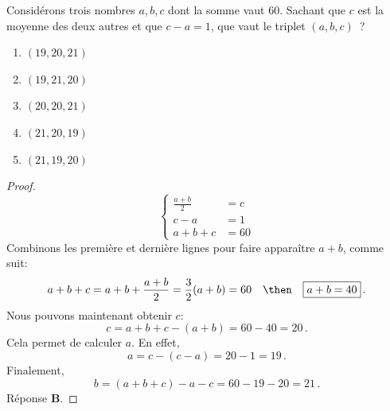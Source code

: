 \label{1.8}%
Considérons trois nombres $a, b, c$ dont la somme vaut $60$. Sachant que $c$
est la moyenne des deux autres et que $c - a = 1$, que vaut le triplet
$(a, b, c)$~?
\begin{enumerate}
  \item $(19,20,21)$
  \item $(19,21,20)$
  \item $(20,20,21)$
  \item $(21,20,19)$
  \item $(21,19,20)$
\end{enumerate}
%
%
\begin{proof}
%
\begin{equation}
  \begin{cases}
    \frac{a+b}{2} &= c \\
    c - a &= 1 \\
    a + b + c &= 60
  \end{cases}
\end{equation}
%
Combinons les première et dernière lignes pour faire apparaître $a+b$, comme suit:
%
\begin{equation*}
  a + b + c = a + b + \frac{a+b}{2} =  \frac{3}{2}(a+b) = 60 \quad \then \quad \boxed{a+b = 40} \,.
\end{equation*}
%
Nous pouvons maintenant obtenir $c$:
%
\begin{equation*}
  \boxed{c} = a + b + c - (a + b) = 60 - 40 = \boxed{20} \,.
\end{equation*}
%
Cela permet de calculer $a$. En effet, 
%
\begin{equation*}
  \boxed{a} = c - (c-a) = 20 - 1 = \boxed{19} \,. 
\end{equation*}
%
Finalement,
%
\begin{equation*}
  \boxed{b} = (a + b + c) - a - c  = 60 - 19 - 20 = \boxed{21} \,.
\end{equation*}
%
Réponse \textbf{B}.
\end{proof}